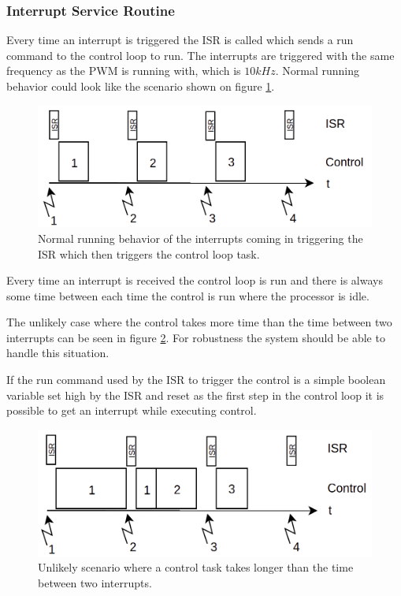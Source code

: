 \subsubsection{Interrupt Service Routine}
\label{sec:isr}
Every time an interrupt is triggered the ISR is called which sends a run command to the control loop to run. The interrupts are triggered with the same frequency as the PWM is running with, which is $10kHz$. Normal running behavior could look like the scenario shown on figure \ref{fig:isr1}. 

\begin{figure}[H]
	\centering
	\includegraphics[width=0.65\linewidth]{pictures/software/isr/isr1.png}
	\caption{Normal running behavior of the interrupts coming in triggering the ISR which then triggers the control loop task.}
	\label{fig:isr1}
\end{figure}

Every time an interrupt is received the control loop is run and there is always some time between each time the control is run where the processor is idle.


The unlikely case where the control takes more time than the time between two interrupts can be seen in figure \ref{fig:isr2}. For robustness the system should be able to handle this situation. 

If the run command used by the ISR to trigger the control is a simple boolean variable set high by the ISR and reset as the first step in the control loop it is possible to get an interrupt while executing control.

\begin{figure}[H]
	\centering
	\includegraphics[width=0.65\linewidth]{pictures/software/isr/isr2.png}
	\caption{Unlikely scenario where a control task takes longer than the time between two interrupts.}
	\label{fig:isr2}
\end{figure}

